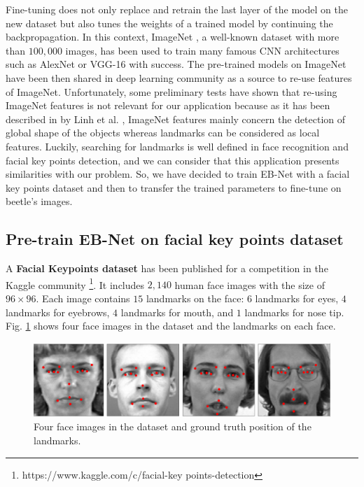 \documentclass[review]{elsarticle}
\begin{document}
Fine-tuning does not only replace and retrain the last layer of the model on
the new dataset but also tunes the weights of a trained model by
continuing the backpropagation. In this context, ImageNet
\cite{imagenet_cvpr09}, a well-known dataset with more than $100,000 $
images, has been used to train many famous CNN architectures such as
AlexNet \cite{krizhevsky2012imagenet} or VGG-16
\cite{simonyan2014very} with success. The pre-trained models on
ImageNet have been then shared in deep learning community as a source
to re-use features of ImageNet. Unfortunately, some preliminary tests
have shown that re-using ImageNet features is not relevant for our
application because as it has been described in by Linh et
al. \cite{lin2016homemade}, ImageNet features mainly concern the
detection of global shape of the objects whereas landmarks can be
considered as local features. Luckily, searching for landmarks is
well defined in face recognition and facial key points detection, and 
we can consider that this application presents similarities with our problem. So,
we have decided to train EB-Net with a facial key points dataset and
then to transfer the trained parameters to fine-tune on beetle's
images.

\subsection{Pre-train EB-Net on facial key points dataset}
A \textbf{Facial Keypoints dataset} has been published for a
competition in the  Kaggle
community \footnote{https://www.kaggle.com/c/facial-key
  points-detection}. It includes $2,140$ human face images with the
size of $96 \times 96$. Each image contains $15$ landmarks on the
face: $6$ landmarks for eyes, $4$ landmarks for eyebrows, $4$
landmarks for mouth, and $1$ landmarks for nose
tip. Fig. \ref{figaface} shows four face images in the dataset and the
landmarks on each face.


\begin{figure}[htbp]
	\centerline{\includegraphics[scale=0.16]{images/face_dataset_2.png}}
	\caption{Four face images in the dataset and ground truth position of the landmarks.}
	\label{figaface}
\end{figure}
\end{document}
